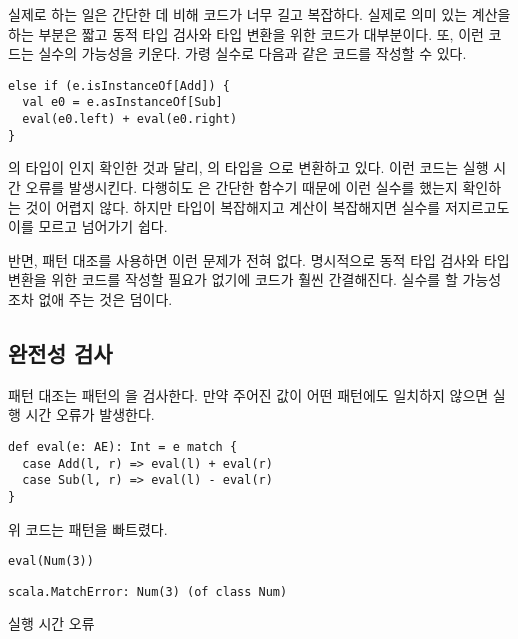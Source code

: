 실제로 하는 일은 간단한 데 비해 코드가 너무 길고 복잡하다. 실제로 의미 있는
계산을 하는 부분은 짧고 동적 타입 검사와 타입 변환을 위한 코드가 대부분이다. 또,
이런 코드는 실수의 가능성을 키운다. 가령 실수로 다음과 같은 코드를 작성할 수
있다.

\begin{verbatim}
else if (e.isInstanceOf[Add]) {
  val e0 = e.asInstanceOf[Sub]
  eval(e0.left) + eval(e0.right)
}
\end{verbatim}

의 타입이 인지 확인한 것과 달리, 의 타입을
으로 변환하고 있다. 이런 코드는 실행 시간 오류를 발생시킨다. 다행히도
은 간단한 함수기 때문에 이런 실수를 했는지 확인하는 것이 어렵지 않다.
하지만 타입이 복잡해지고 계산이 복잡해지면 실수를 저지르고도 이를 모르고
넘어가기 쉽다.

반면, 패턴 대조를 사용하면 이런 문제가 전혀 없다. 명시적으로 동적 타입 검사와
타입 변환을 위한 코드를 작성할 필요가 없기에 코드가 훨씬 간결해진다. 실수를 할
가능성조차 없애 주는 것은 덤이다.

\subsection{완전성 검사}

패턴 대조는 패턴의 을 검사한다. 만약 주어진 값이 어떤
패턴에도 일치하지 않으면 실행 시간 오류가 발생한다.

\begin{verbatim}
def eval(e: AE): Int = e match {
  case Add(l, r) => eval(l) + eval(r)
  case Sub(l, r) => eval(l) - eval(r)
}
\end{verbatim}

위 코드는  패턴을 빠트렸다.

\begin{verbatim}
eval(Num(3))
\end{verbatim}
\vspace{-1em}
\begin{mdframed}[hidealllines=true,backgroundcolor=gray!10,innerleftmargin=3pt,innerrightmargin=3pt,leftmargin=-3pt,rightmargin=-3pt]
\begin{verbatim}
scala.MatchError: Num(3) (of class Num)
\end{verbatim}
\vspace{-2em}
\begin{flushright}
\scriptsize\textsf{실행 시간 오류}
\end{flushright}
\end{mdframed}


